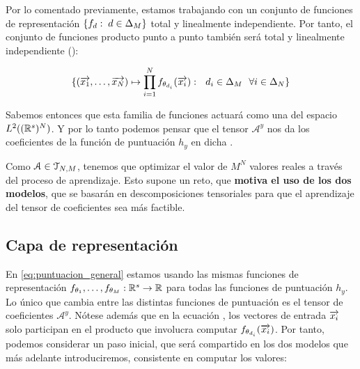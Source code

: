 \begin{observacion}
	Por lo comentado previamente, estamos trabajando con un conjunto de funciones de representación $\{ f_d: \; d \in \Delta_{M} \}$ total y linealmente independiente. Por tanto, el conjunto de funciones producto punto a punto también será total y linealmente independiente ():

	\begin{equation}
		\{ (\overrightarrow{x_1}, \ldots, \overrightarrow{x_N}) \mapsto \prod_{i = 1}^{N} f_{\theta_{d_i}} (\overrightarrow{x_i}): \ \  d_i \in \Delta_{M} \ \  \forall i \in \Delta_{N}  \}
	\end{equation}


	Sabemos entonces que esta familia de funciones actuará como una  del espacio $L^2((\mathbb{R}^s)^N)$. Y por lo tanto podemos pensar que el tensor $\mathcal{A}^y$ nos da los coeficientes de la función de puntuación $h_y$ en dicha .
\end{observacion}

\begin{observacion}
	Como $\mathcal{A} \in \mathcal{T}_{N, M}$, tenemos que optimizar el valor de $M^N$ valores reales a través del proceso de aprendizaje. Esto supone un reto, que \textbf{motiva el uso de los dos modelos}, que se basarán en descomposiciones tensoriales para que el aprendizaje del tensor de coeficientes sea más factible.
\end{observacion}

\subsection{Capa de representación} \label{subs:capa_de_representacion}

En \eqref{eq:puntuacion_general} estamos usando las mismas funciones de representación $f_{\theta_1}, \ldots, f_{\theta_M}: \mathbb{R}^s \to \mathbb{R}$ para todas las funciones de puntuación $h_y$. Lo único que cambia entre las distintas funciones de puntuación es el tensor de coeficientes $\mathcal{A}^y$. Nótese además que en la ecuación , los vectores de entrada $\overrightarrow{x_i}$ solo participan en el producto que involucra computar $f_{\theta_{d_i}}(\overrightarrow{x_i})$. Por tanto, podemos considerar un paso inicial, que será compartido en los dos modelos que más adelante introduciremos, consistente en computar los valores:

